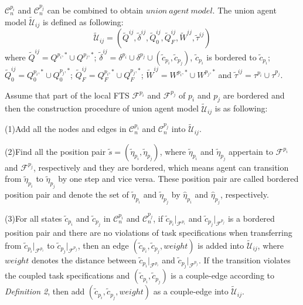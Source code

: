 \documentclass[journal]{IEEEtran}
\begin{document}
$\mathcal{C}^{p_i}_n$ and $\mathcal{C}^{p_j}_n$ can be combined to obtain $union\ agent\ model$. The union agent model $\widetilde{\mathcal{U}}_{ij}$ is defined as following:
$$\widetilde{\mathcal{U}}_{ij}=(\widetilde{Q}^{ij},\tilde{\delta}^{ij},\widetilde{Q}^{ij}_0,\widetilde{Q}^{ij}_F,\widetilde{W}^{ij},\tilde{\tau}^{ij})$$
where $\widetilde{Q}^{ij}=Q^{p_i,\ast}\cup Q^{p_j,\ast}$; $\tilde{\delta}^{ij}=\delta^{p_i}\cup \delta^{p_j} \cup (\tilde{c}_{p_i},\tilde{c}_{p_j})$, $\tilde{c}_{p_i}$ is bordered to $\tilde{c}_{p_i}$; $\widetilde{Q}^{ij}_0=Q^{p_i,\ast}_0\cup Q^{p_j,\ast}_0$; $\widetilde{Q}^{ij}_F=Q^{p_i,\ast}_F\cup Q^{p_j,\ast}_F$; $\widetilde{W}^{ij}=W^{p_i,\ast}\cup W^{p_j,\ast}$ and $\tilde{\tau}^{ij}=\tau^{p_i}\cup \tau^{p_j}$.\par
Assume that part of the local FTS $\mathcal{F}^{p_i}$ and $\mathcal{F}^{p_j}$ of $p_i$ and $p_j$ are bordered and then the construction procedure of union agent model $\widetilde{\mathcal{U}}_{ij}$ is as following:\par
(1)Add all the nodes and edges in $\mathcal{C}^{p_i}_n$ and $\mathcal{C}^{p_j}_n$ into $\widetilde{\mathcal{U}}_{ij}$.\par
(2)Find all the position pair $\tilde{s}=(\tilde{\eta}_{p_i},\tilde{\eta}_{p_j})$, where $\tilde{\eta}_{p_i}$ and $\tilde{\eta}_{p_j}$ appertain to $\mathcal{F}^{p_i}$ and $\mathcal{F}^{p_j}$, respectively and they are bordered, which means agent can transition from $\tilde{\eta}_{p_i}$ to $\tilde{\eta}_{p_j}$ by one step and vice versa. These position pair are called bordered position pair and denote the set of $\tilde{\eta}_{p_i}$ and $\tilde{\eta}_{p_j}$ by $\hat{\eta}_{p_i}$ and $\hat{\eta}_{p_j}$, respectively.\par
(3)For all states $\tilde{c}_{p_i}$ and $\tilde{c}_{p_j}$ in $\mathcal{C}^{p_i}_n$ and $\mathcal{C}^{p_j}_n$, if $\tilde{c}_{p_i}|_{\mathcal{F}^{p_i}}$ and $\tilde{c}_{p_j}|_{\mathcal{F}^{p_j}}$ is a bordered position pair and there are no violations of task specifications when transferring from $\tilde{c}_{p_i}|_{\mathcal{F}^{p_i}}$ to $\tilde{c}_{p_j}|_{\mathcal{F}^{p_j}}$, then an edge $(\tilde{c}_{p_i},\tilde{c}_{p_j},weight)$ is added into $\widetilde{\mathcal{U}}_{ij}$, where $weight$ denotes the distance between $\tilde{c}_{p_i}|_{\mathcal{F}^{p_i}}$ and $\tilde{c}_{p_j}|_{\mathcal{F}^{p_j}}$. If the transition violates the coupled task specifications and $(\tilde{c}_{p_i},\tilde{c}_{p_j})$ is a couple-edge according to \emph{Definition 2}, then add $(\tilde{c}_{p_i},\tilde{c}_{p_j},weight)$ as a couple-edge into $\widetilde{\mathcal{U}}_{ij}$.\par
\end{document}

